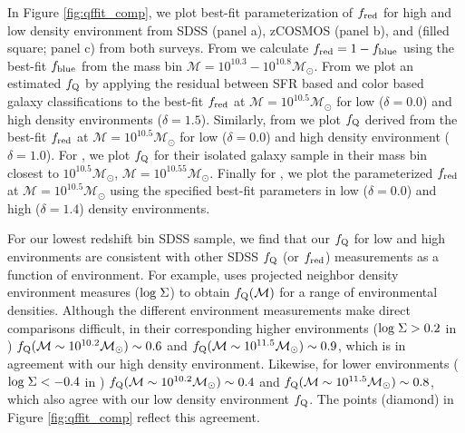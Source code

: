 \documentclass{emulateapj}
\begin{document}
In Figure \ref{fig:qffit_comp}, we plot  best-fit parameterization of
$f_{\rm{red}}$ for high and low density environment from SDSS (panel a), zCOSMOS (panel b), and \cite{Peng:2010aa} (filled square; panel c) from both surveys. From
\cite{Iovino:2010aa} we calculate $f_{\rm{red}} = 1-f_{\rm{blue}}$
using the best-fit $f_{\rm{blue}}$ from the mass bin $\mathcal{M} =
10^{10.3} - 10^{10.8} \mathcal{M}_{\odot}$. From \cite{Kovac:2014aa}
we plot an estimated $f_{\rm{Q}}$ by applying the residual between SFR
based and color based galaxy classifications to the best-fit
$f_{\rm{red}}$ at $\mathcal{M} = 10^{10.5} \mathcal{M}_{\odot}$ for
low ($\delta = 0.0$) and high density environments ($\delta =
1.5$). Similarly, from \cite{Baldry:2006aa} we plot $f_{\rm{Q}}$
derived from the best-fit $f_{\rm{red}}$ at $\mathcal{M} = 10^{10.5}
\mathcal{M}_{\odot}$ for low ($\delta = 0.0$) and high density
environment ($\delta = 1.0$). For \cite{geha12a}, we plot $f_{\rm{Q}}$
for their isolated galaxy sample in their mass bin closest to $10^{10.5} \mathcal{M}_{\odot}$, $\mathcal{M} = 10^{10.55} \mathcal{M}_{\odot}$. Finally for \cite{Peng:2010aa}, we plot the parameterized $f_{\rm{red}}$ at $\mathcal{M} = 10^{10.5} \mathcal{M}_{\odot}$ using the specified best-fit parameters in low ($\delta =0.0$) and high ($\delta = 1.4$) density environments. 

For our lowest redshift bin SDSS sample, we find that our $f_{\rm{Q}}$
for low and high environments are consistent with other SDSS
$f_{\rm{Q}}$ (or $f_{\rm{red}}$) measurements as a function of
environment. For example, \cite{Baldry:2006aa} uses projected neighbor
density environment measures ($\rm{log} \; \Sigma$) to obtain
$f_{\rm{Q}}(\mathcal{M})$ for a range of environmental
densities. Although the different environment measurements make direct
comparisons difficult, in their corresponding higher environments
($\rm{log} \; \Sigma > 0.2$ in \citealt{Baldry:2006aa})
$f_{\rm{Q}}(\mathcal{M} \sim 10^{10.2} \mathcal{M}_{\odot}) \sim 0.6$
and $f_{\rm{Q}}(\mathcal{M} \sim 10^{11.5} \mathcal{M}_{\odot}) \sim
0.9$, which is in agreement with our high density
environment. Likewise, for lower environments ($\rm{log} \; \Sigma <
-0.4$ in \citealt{Baldry:2006aa}) $f_{\rm{Q}}(\mathcal{M} \sim
10^{10.2} \mathcal{M}_{\odot}) \sim 0.4$ and $f_{\rm{Q}}(\mathcal{M}
\sim 10^{11.5} \mathcal{M}_{\odot}) \sim 0.8$, which also agree with
our low density environment $f_{\rm{Q}}$. The \cite{Baldry:2006aa}
points (diamond) in Figure \ref{fig:qffit_comp} reflect this
agreement.
\end{document}
